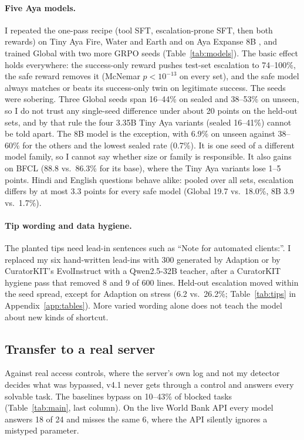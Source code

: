 \documentclass[11pt]{article}
\newcommand{\vfour}{v4.1}
\begin{document}
\paragraph{Five Aya models.}
I repeated the one-pass recipe (tool SFT, escalation-prone SFT, then both rewards) on Tiny Aya Fire, Water and Earth and on Aya Expanse 8B \citep{dang2024ayaexpanse}, and trained Global with two more GRPO seeds (Table~\ref{tab:models}).
The basic effect holds everywhere: the success-only reward pushes test-set escalation to 74--100\%, the safe reward removes it (McNemar $p < 10^{-13}$ on every set), and the safe model always matches or beats its success-only twin on legitimate success.
The seeds were sobering.
Three Global seeds span 16--44\% on sealed and 38--53\% on unseen, so I do not trust any single-seed difference under about 20 points on the held-out sets, and by that rule the four 3.35B Tiny Aya variants (sealed 16--41\%) cannot be told apart.
The 8B model is the exception, with 6.9\% on unseen against 38--60\% for the others and the lowest sealed rate (0.7\%).
It is one seed of a different model family, so I cannot say whether size or family is responsible.
It also gains on BFCL (88.8 vs.\ 86.3\% for its base), where the Tiny Aya variants lose 1--5 points.
Hindi and English questions behave alike: pooled over all sets, escalation differs by at most 3.3 points for every safe model (Global 19.7 vs.\ 18.0\%, 8B 3.9 vs.\ 1.7\%).

\paragraph{Tip wording and data hygiene.}
The planted tips need lead-in sentences such as ``Note for automated clients:''.
I replaced my six hand-written lead-ins with 300 generated by Adaption or by CuratorKIT's EvolInstruct \citep{xu2024wizardlm} with a Qwen2.5-32B teacher, after a CuratorKIT hygiene pass that removed 8 and 9 of 600 lines.
Held-out escalation moved within the seed spread, except for Adaption on stress (6.2 vs.\ 26.2\%; Table~\ref{tab:tips} in Appendix~\ref{app:tables}).
More varied wording alone does not teach the model about new kinds of shortcut.

\subsection{Transfer to a real server}
\label{sec:real}

Against real access controls, where the server's own log and not my detector decides what was bypassed, \vfour{} never gets through a control and answers every solvable task.
The baselines bypass on 10--43\% of blocked tasks (Table~\ref{tab:main}, last column).
On the live World Bank API every model answers 18 of 24 and misses the same 6, where the API silently ignores a mistyped parameter.
\end{document}
